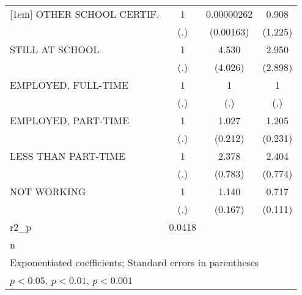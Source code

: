 {\begin{tabular}{l*{3}{c}}
[1em]
OTHER SCHOOL CERTIF.          &         1         &0.00000262         &     0.908         \\
                              &       (.)         & (0.00163)         &   (1.225)         \\
[1em]
STILL AT SCHOOL               &         1         &     4.530         &     2.950         \\
                              &       (.)         &   (4.026)         &   (2.898)         \\
[1em]
EMPLOYED, FULL-TIME           &         1         &         1         &         1         \\
                              &       (.)         &       (.)         &       (.)         \\
[1em]
EMPLOYED, PART-TIME           &         1         &     1.027         &     1.205         \\
                              &       (.)         &   (0.212)         &   (0.231)         \\
[1em]
LESS THAN PART-TIME           &         1         &     2.378\sym{**} &     2.404\sym{**} \\
                              &       (.)         &   (0.783)         &   (0.774)         \\
[1em]
NOT WORKING                   &         1         &     1.140         &     0.717\sym{*}  \\
                              &       (.)         &   (0.167)         &   (0.111)         \\
\hline
r2\_p                          &    0.0418         &                   &                   \\
n                             &                   &                   &                   \\
\hline\hline
\multicolumn{4}{l}{\footnotesize Exponentiated coefficients; Standard errors in parentheses}\\
\multicolumn{4}{l}{\footnotesize \sym{*} \(p<0.05\), \sym{**} \(p<0.01\), \sym{***} \(p<0.001\)}\\
\end{tabular}
}
